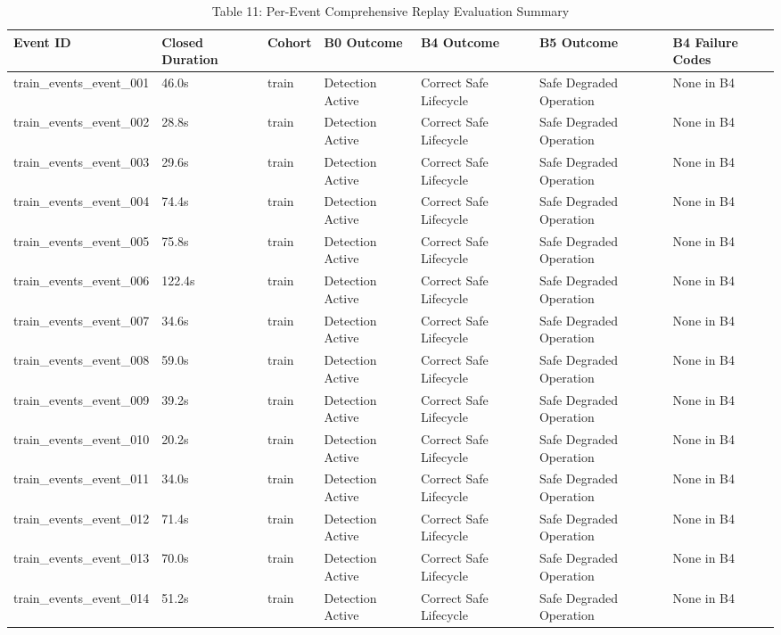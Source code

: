 \begin{table}[t]
\centering
\caption{Table 11: Per-Event Comprehensive Replay Evaluation Summary}
\label{tab:table11_per_event_summary}
\begin{tabular}{lllllll}
\hline
Event ID & Closed Duration & Cohort & B0 Outcome & B4 Outcome & B5 Outcome & B4 Failure Codes \\
\hline
train\_events\_event\_001 & 46.0s & train & Detection Active & Correct Safe Lifecycle & Safe Degraded Operation & None in B4 \\
train\_events\_event\_002 & 28.8s & train & Detection Active & Correct Safe Lifecycle & Safe Degraded Operation & None in B4 \\
train\_events\_event\_003 & 29.6s & train & Detection Active & Correct Safe Lifecycle & Safe Degraded Operation & None in B4 \\
train\_events\_event\_004 & 74.4s & train & Detection Active & Correct Safe Lifecycle & Safe Degraded Operation & None in B4 \\
train\_events\_event\_005 & 75.8s & train & Detection Active & Correct Safe Lifecycle & Safe Degraded Operation & None in B4 \\
train\_events\_event\_006 & 122.4s & train & Detection Active & Correct Safe Lifecycle & Safe Degraded Operation & None in B4 \\
train\_events\_event\_007 & 34.6s & train & Detection Active & Correct Safe Lifecycle & Safe Degraded Operation & None in B4 \\
train\_events\_event\_008 & 59.0s & train & Detection Active & Correct Safe Lifecycle & Safe Degraded Operation & None in B4 \\
train\_events\_event\_009 & 39.2s & train & Detection Active & Correct Safe Lifecycle & Safe Degraded Operation & None in B4 \\
train\_events\_event\_010 & 20.2s & train & Detection Active & Correct Safe Lifecycle & Safe Degraded Operation & None in B4 \\
train\_events\_event\_011 & 34.0s & train & Detection Active & Correct Safe Lifecycle & Safe Degraded Operation & None in B4 \\
train\_events\_event\_012 & 71.4s & train & Detection Active & Correct Safe Lifecycle & Safe Degraded Operation & None in B4 \\
train\_events\_event\_013 & 70.0s & train & Detection Active & Correct Safe Lifecycle & Safe Degraded Operation & None in B4 \\
train\_events\_event\_014 & 51.2s & train & Detection Active & Correct Safe Lifecycle & Safe Degraded Operation & None in B4 \\

\end{tabular}
\end{table}
